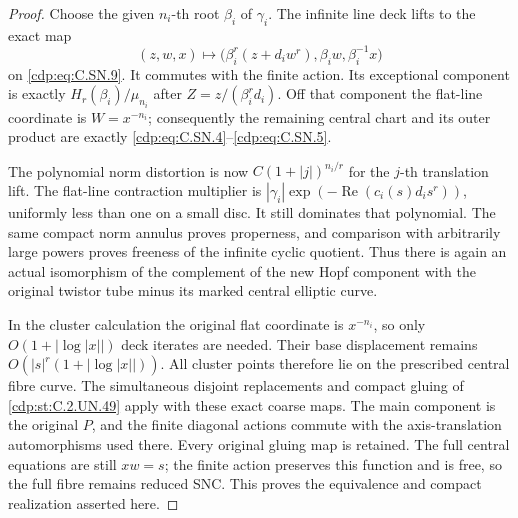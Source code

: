 \begin{proof}
Choose the given $n_i$-th root $\beta_i$
of $\gamma_i$. The infinite line deck
lifts to the exact map
\[
 (z,w,x)\mapsto
   \bigl(\beta_i^r(z+d_iw^r),\beta_iw,\beta_i^{-1}x\bigr)
                                                        \tag{C.SN.10}\label{cdp:eq:C.SN.10}
\]
on \eqref{cdp:eq:C.SN.9}. It commutes with the finite
action. Its exceptional component is
exactly $H_r(\beta_i)/\mu_{n_i}$ after
$Z=z/(\beta_i^r d_i)$.
Off that component the flat-line
coordinate is $W=x^{-n_i}$; consequently
the remaining central chart and its
outer product are exactly
\eqref{cdp:eq:C.SN.4}--\eqref{cdp:eq:C.SN.5}.

The polynomial norm distortion is now
$C(1+|j|)^{n_i/r}$ for the $j$-th
translation lift. The flat-line
contraction multiplier is
$|\gamma_i|\exp(-\operatorname{Re}(c_i(s)d_i s^r))$,
uniformly less than one on a small disc.
It still dominates that polynomial.
The same compact norm annulus proves
properness, and comparison with arbitrarily
large powers proves freeness of the
infinite cyclic quotient. Thus there
is again an actual isomorphism of the
complement of the new Hopf component
with the original twistor tube minus
its marked central elliptic curve.

In the cluster calculation the original
flat coordinate is $x^{-n_i}$, so only
$O(1+|\log|x||)$ deck iterates are
needed. Their base displacement remains
$O(|s|^r(1+|\log|x||))$. All cluster
points therefore lie on the prescribed
central fibre curve. The simultaneous
disjoint replacements and compact gluing
of \ref{cdp:st:C.2.UN.49} apply with these exact
coarse maps. The main component is the
original $P$, and the finite diagonal
actions commute with the axis-translation
automorphisms used there. Every original
gluing map is retained. The full
central equations are still $xw=s$;
the finite action preserves this
function and is free, so the full
fibre remains reduced SNC.
This proves the equivalence and
compact realization asserted here.
\end{proof}


